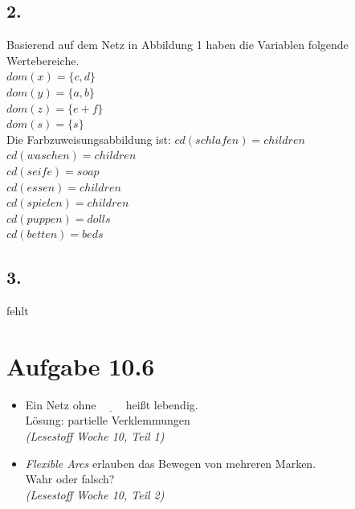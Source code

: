 \documentclass[12pt, paper=a4]{article}
\begin{document}
\subsection*{2.}
Basierend auf dem Netz in Abbildung 1 haben die Variablen folgende Wertebereiche.\\
$dom(x)=\{c,d\}$\\
$dom(y)=\{a,b\}$\\
$dom(z)=\{e+f\}$\\
$dom(s)=\{s\}$\\
Die Farbzuweisungsabbildung ist:
$cd(schlafen) = children$\\
$cd(waschen)=children$\\
$cd(seife)=soap$\\
$cd(essen)=children$\\
$cd(spielen)=children$\\
$cd(puppen)=dolls$\\
$cd(betten)=beds$
\subsection*{3.}
fehlt
\section*{Aufgabe 10.6}
\begin{itemize}
	\item Ein Netz ohne \(\underline{\qquad}\) hei{\ss}t lebendig.\\
		L\"osung: partielle Verklemmungen\\
		\textit{(Lesestoff Woche 10, Teil 1)}
	\item \textit{Flexible Arcs} erlauben das Bewegen von mehreren Marken.\\
		Wahr oder falsch?\\
		\textit{(Lesestoff Woche 10, Teil 2)}
\end{itemize}
\end{document}
